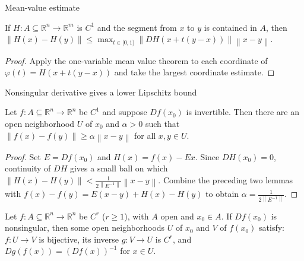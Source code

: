 \begin{lemma}{Mean-value estimate}

If \(H:A \subseteq \mathbb{R}^{n}\rightarrow\mathbb{R}^{m}\) is \(C^{1}\) and the segment from \(x\) to \(y\) is contained in \(A\), then \(\left\| {H(x) - H(y)} \right\| \leq \max_{t \in {\lbrack{0,1}\rbrack}}\left\| {DH\left( {x + t\left( {y - x} \right)} \right)} \right\|\left\| {x - y} \right\|\).

\end{lemma}

\begin{proof}

Apply the one-variable mean value theorem to each coordinate of \(\varphi(t) = H\left( {x + t\left( {y - x} \right)} \right)\) and take the largest coordinate estimate.

\end{proof}

\begin{lemma}{Nonsingular derivative gives a lower Lipschitz bound}

Let \(f:A \subseteq \mathbb{R}^{n}\rightarrow\mathbb{R}^{n}\) be \(C^{1}\) and suppose \(Df\left( x_{0} \right)\) is invertible. Then there are an open neighborhood \(U\) of \(x_{0}\) and \(\alpha > 0\) such that \(\left\| {f(x) - f(y)} \right\| \geq \alpha\left\| {x - y} \right\|\) for all \(x,y \in U\).

\end{lemma}

\begin{proof}

Set \(E = Df\left( x_{0} \right)\) and \(H(x) = f(x) - Ex\). Since \(DH\left( x_{0} \right) = 0\), continuity of \(DH\) gives a small ball on which \(\left\| {H(x) - H(y)} \right\| < \frac{1}{2\left\| E^{- 1} \right\|}\left\| {x - y} \right\|\). Combine the preceding two lemmas with \(f(x) - f(y) = E\left( {x - y} \right) + H(x) - H(y)\) to obtain \(\alpha = \frac{1}{2\left\| E^{- 1} \right\|}\).

\end{proof}

\begin{theorem}{}

Let \(f:A \subseteq \mathbb{R}^{n}\rightarrow\mathbb{R}^{n}\) be \(C^{r}\) (\(r \geq 1\)), with \(A\) open and \(x_{0} \in A\). If \(Df\left( x_{0} \right)\) is nonsingular, then some open neighborhoods \(U\) of \(x_{0}\) and \(V\) of \(f\left( x_{0} \right)\) satisfy: \(f:U\rightarrow V\) is bijective, its inverse \(g:V\rightarrow U\) is \(C^{r}\), and \(Dg\left( {f(x)} \right) = \left( {Df(x)} \right)^{- 1}\) for \(x \in U\).

\end{theorem}

